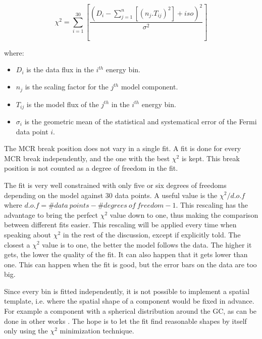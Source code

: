 \begin{equation}
\chi^2 = \sum_{i=1}^{30} \left[ \frac{ \left( D_i - \sum_{j=1}^{n} \left[ (n_j.T_{ij})^2 \right] + iso \right) ^2}{\sigma^2} \right]
\end{equation}

where:
\begin{itemize}
\item $D_i$ is the data flux in the $i^{th}$ energy bin.
\item $n_j$ is the scaling factor for the $j^{th}$ model component.
\item $T_{ij}$ is the model flux of the $j^{th}$ in the $i^{th}$ energy bin.
\item $\sigma_i$ is the geometric mean of the statistical and systematical error of the Fermi data point $i$.
\end{itemize}

The MCR break position does not vary in a single fit. A fit is done for every MCR break independently, and the one with the best $\chi^2$ is kept. This break position is not counted as a degree of freedom in the fit.

The fit is very well constrained with only five or six degrees of freedoms depending on the model against 30 data points. A useful value is the $\chi^2 / d.o.f$ where $d.o.f = \#data\ points - \#degrees\ of\ freedom - 1$. This rescaling has the advantage to bring the perfect $\chi^2$ value down to one, thus making the comparison between different fits easier. This rescaling will be applied every time when speaking about $\chi^2$ in the rest of the discussion, except if explicitly told. 
The closest a $\chi^2$ value is to one, the better the model follows the data. The higher it gets, the lower the quality of the fit. It can also happen that it gets lower than one. This can happen when the fit is good, but the error bars on the data are too big.


Since every bin is fitted independently, it is not possible to implement a spatial template, i.e. where the spatial shape of a component would be fixed in advance. For example a component with a spherical distribution around the GC, as can be done in other works . The hope is to let the fit find reasonable shapes by itself only using the $\chi ^2$ minimization technique.




